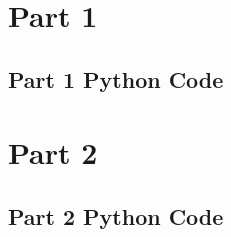 \section{Part 1}
\subsection{Part 1 Python Code}
\label{appx:part1_code}


\section{Part 2}
\subsection{Part 2 Python Code}
\label{appx:part2_code}
